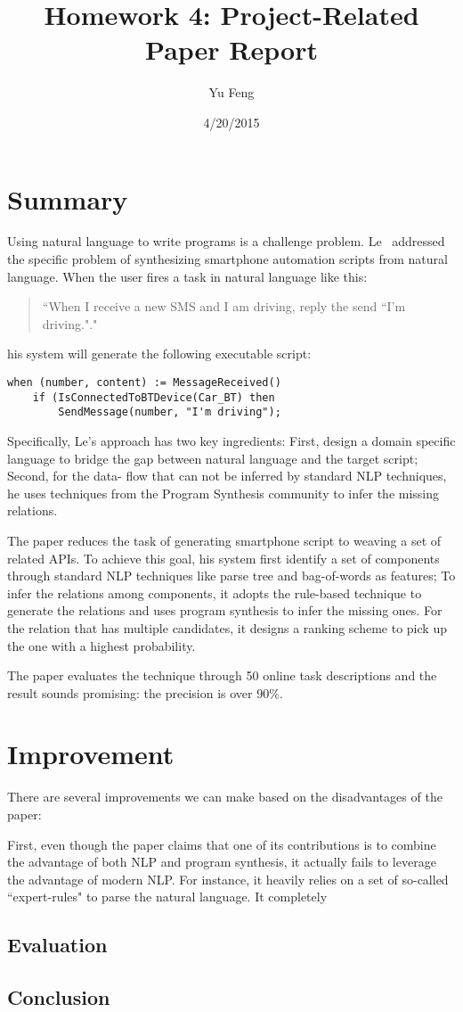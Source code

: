 \documentclass[10pt]{article}
\title{Homework 4: Project-Related Paper Report}
\author{Yu Feng}
\date{4/20/2015}
\begin{document}
\maketitle

\section{Summary}\label{sec:intro}
Using natural language to write programs is a challenge problem.
Le~\cite{smart} addressed the specific problem of synthesizing smartphone 
automation scripts from natural language. When the user fires a task in 
natural language like this:
\begin{quotation}
``When I receive a new SMS and I am driving, reply the send ``I'm driving."."
\end{quotation}
his system will generate the following executable script:
\small\begin{verbatim}
when (number, content) := MessageReceived()
    if (IsConnectedToBTDevice(Car_BT) then
        SendMessage(number, "I'm driving");
\end{verbatim}
Specifically, Le's approach has two key ingredients: First, design
a domain specific language to bridge the gap between natural language and the
target script; Second, for the data- flow that can not be inferred by 
standard NLP techniques, he uses techniques from the Program Synthesis community
to infer the missing relations.

The paper reduces the task of generating smartphone script to weaving a set of 
related APIs. To achieve this goal, his system first identify a set of components 
through standard NLP techniques like parse tree and bag-of-words as features; 
To infer the relations among components, it adopts the rule-based technique to 
generate the relations and uses program synthesis to infer the missing ones. For
the relation that has multiple candidates, it designs a ranking scheme to pick up
the one with a highest probability.

The paper evaluates the technique through 50 online task descriptions and the result
sounds promising: the precision is over 90\%.


\section{Improvement}\label{sec:alg}
There are several improvements we can make based on the disadvantages of the paper:

First, even though the paper claims that one of its contributions is to combine the
advantage of both NLP and program synthesis, it actually fails to leverage the 
advantage of modern NLP. For instance, it heavily relies on a set of so-called 
``expert-rules" to parse the natural language. It completely
\subsection{Evaluation}


\subsection{Conclusion}




\end{document}
